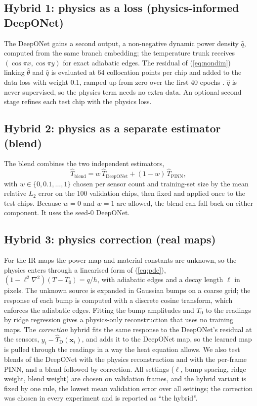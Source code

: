 \documentclass[journal]{IEEEtran}
\begin{document}
\subsection{Hybrid 1: physics as a loss (physics-informed DeepONet)}
The DeepONet gains a second output, a non-negative dynamic power density $\hat q$, computed from the same branch embedding; the temperature trunk receives $(\cos\pi x,\cos\pi y)$ for exact adiabatic edges.
The residual of (\ref{eq:nondim}) linking $\hat\theta$ and $\hat q$ is evaluated at 64 collocation points per chip and added to the data loss with weight 0.1, ramped up from zero over the first 40 epochs \cite{wang2021pideeponet}.
$\hat q$ is never supervised, so the physics term needs no extra data.
An optional second stage refines each test chip with the physics loss.

\subsection{Hybrid 2: physics as a separate estimator (blend)}
The blend combines the two independent estimators,
\begin{equation}\label{eq:blend}
\hat T_\mathrm{blend} = w\,\hat T_\mathrm{DeepONet} + (1-w)\,\hat T_\mathrm{PINN},
\end{equation}
with $w\in\{0,0.1,\dots,1\}$ chosen per sensor count and training-set size by the mean relative $L_2$ error on the 100 validation chips, then fixed and applied once to the test chips.
Because $w=0$ and $w=1$ are allowed, the blend can fall back on either component.
It uses the seed-0 DeepONet.

\subsection{Hybrid 3: physics correction (real maps)}
For the IR maps the power map and material constants are unknown, so the physics enters through a linearised form of (\ref{eq:pde}), $(1-\ell^2\nabla^2)(T-T_0)=q/h$, with adiabatic edges and a decay length $\ell$ in pixels.
The unknown source is expanded in Gaussian bumps on a coarse grid; the response of each bump is computed with a discrete cosine transform, which enforces the adiabatic edges.
Fitting the bump amplitudes and $T_0$ to the readings by ridge regression gives a physics-only reconstruction that uses no training maps.
The \emph{correction} hybrid fits the same response to the DeepONet's residual at the sensors, $y_i-\hat T_\mathrm{D}(\mathbf{x}_i)$, and adds it to the DeepONet map, so the learned map is pulled through the readings in a way the heat equation allows.
We also test blends of the DeepONet with the physics reconstruction and with the per-frame PINN, and a blend followed by correction.
All settings ($\ell$, bump spacing, ridge weight, blend weight) are chosen on validation frames, and the hybrid variant is fixed by one rule, the lowest mean validation error over all settings; the correction was chosen in every experiment and is reported as ``the hybrid''.
\end{document}
